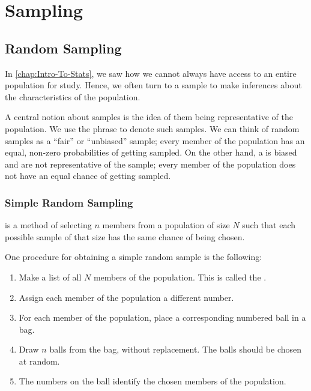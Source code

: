 \chapter{Sampling}

\section{Random Sampling}

In \SS\ref{chap:Intro-To-Stats}, we saw how we cannot always have access to an entire population for study. Hence, we often turn to a sample to make inferences about the characteristics of the population.

A central notion about samples is the idea of them being representative of the population. We use the phrase  to denote such samples. We can think of random samples as a ``fair'' or ``unbiased'' sample; every member of the population has an equal, non-zero probabilities of getting sampled. On the other hand, a  is biased and are not representative of the sample; every member of the population does not have an equal chance of getting sampled.

\subsection{Simple Random Sampling}

 is a method of selecting $n$ members from a population of size $N$ such that each possible sample of that size has the same chance of being chosen.

One procedure for obtaining a simple random sample is the following:

\begin{recipe}
    \phantom{.}
    \begin{enumerate}
        \item Make a list of all $N$ members of the population. This is called the .
        \item Assign each member of the population a different number.
        \item For each member of the population, place a corresponding numbered ball in a bag.
        \item Draw $n$ balls from the bag, without replacement. The balls should be chosen at random.
        \item The numbers on the ball identify the chosen members of the population.
    \end{enumerate}
\end{recipe}

